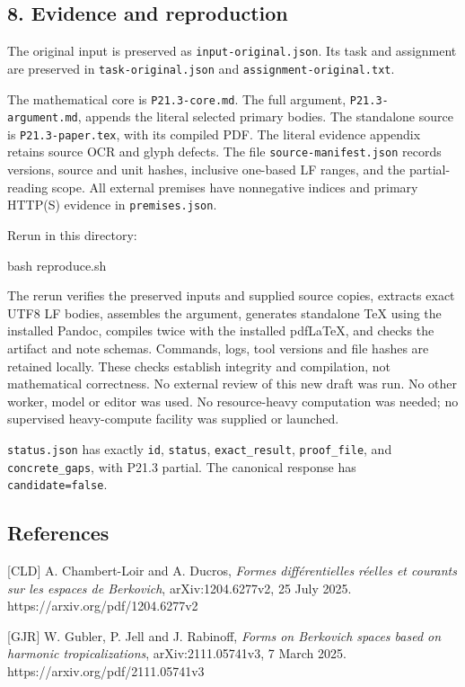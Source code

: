 \documentclass[
  11pt,
]{article}
\newenvironment{Shaded}{}{}
\newcommand{\FunctionTok}[1]{\textcolor[rgb]{0.02,0.16,0.49}{#1}}
\newcommand{\NormalTok}[1]{#1}
\begin{document}
\subsection{8. Evidence and
reproduction}\label{evidence-and-reproduction}

The original input is preserved as \texttt{input-original.json}. Its
task and assignment are preserved in \texttt{task-original.json} and
\texttt{assignment-original.txt}.

The mathematical core is \texttt{P21.3-core.md}. The full argument,
\texttt{P21.3-argument.md}, appends the literal selected primary bodies.
The standalone source is \texttt{P21.3-paper.tex}, with its compiled
PDF. The literal evidence appendix retains source OCR and glyph defects.
The file \texttt{source-manifest.json} records versions, source and unit
hashes, inclusive one-based LF ranges, and the partial-reading scope.
All external premises have nonnegative indices and primary HTTP(S)
evidence in \texttt{premises.json}.

Rerun in this directory:

\begin{Shaded}
\begin{Highlighting}[]
\FunctionTok{bash}\NormalTok{ reproduce.sh}
\end{Highlighting}
\end{Shaded}

The rerun verifies the preserved inputs and supplied source copies,
extracts exact UTF8 LF bodies, assembles the argument, generates
standalone TeX using the installed Pandoc, compiles twice with the
installed pdfLaTeX, and checks the artifact and note schemas. Commands,
logs, tool versions and file hashes are retained locally. These checks
establish integrity and compilation, not mathematical correctness. No
external review of this new draft was run. No other worker, model or
editor was used. No resource-heavy computation was needed; no supervised
heavy-compute facility was supplied or launched.

\texttt{status.json} has exactly \texttt{id}, \texttt{status},
\texttt{exact\_result}, \texttt{proof\_file}, and
\texttt{concrete\_gaps}, with P21.3 partial. The canonical response has
\texttt{candidate=false}.

\subsection{References}\label{references}

{[}CLD{]} A. Chambert-Loir and A. Ducros, \emph{Formes différentielles
réelles et courants sur les espaces de Berkovich}, arXiv:1204.6277v2, 25
July 2025. https://arxiv.org/pdf/1204.6277v2

{[}GJR{]} W. Gubler, P. Jell and J. Rabinoff, \emph{Forms on Berkovich
spaces based on harmonic tropicalizations}, arXiv:2111.05741v3, 7 March
2025. https://arxiv.org/pdf/2111.05741v3
\end{document}
